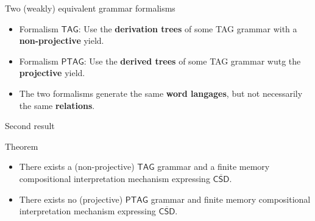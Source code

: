 \documentclass{beamer}
\begin{document}
\begin{frame}{Two (weakly) equivalent grammar formalisms}
  \begin{itemize}
  \item Formalism $\mathsf{TAG}$: Use the {\bf derivation trees} of some TAG grammar with a \textbf{non-projective} yield.
  \item Formalism $\mathsf{PTAG}$: Use the {\bf derived trees} of some TAG grammar wutg the \textbf{projective} yield.
  \item The two formalisms generate the same \textbf{word langages}, but not necessarily the same \textbf{relations}.
  \end{itemize}

  \begin{center}
  \end{center}
\end{frame}



\begin{frame}{Second result}
  \begin{block}{Theorem}
    \begin{itemize}
    \item There exists a (non-projective) $\mathsf{TAG}$ grammar and a finite memory compositional interpretation mechanism expressing $\overline{\mathsf{CSD}}$.
    \item There exists no (projective) $\mathsf{PTAG}$ grammar and finite memory compositional interpretation mechanism expressing $\overline{\mathsf{CSD}}$.
    \end{itemize}
  \end{block}
\end{frame}
\end{document}

